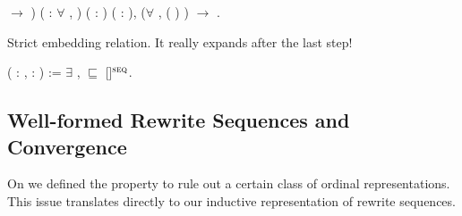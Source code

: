 \begin{singlespace}
\begin{coqdoccode}
\ensuremath{\rightarrow} )
( : \ensuremath{\forall} ,
 )\coqdoceol
\coqdocindent{5.00em}
( :
 
) (\coqdocvar{$\tau$} : 
),\coqdoceol
\coqdocindent{9.50em}
(\ensuremath{\forall} , ( )
 \coqdocvariable{$\tau$})
\ensuremath{\rightarrow}\coqdoceol
\coqdocindent{9.50em}
 
 
\coqdocvariable{$\tau$}.\coqdoceol
\end{coqdoccode}
\end{singlespace}

Strict embedding relation. It really expands after the last step!
\begin{singlespace}
\begin{coqdoccode}
\coqdocnoindent
{}
    (\coqdocvar{$\rho$} :
,
\coqdocvar{$\tau$} :
) := \ensuremath{\exists} ,
\coqdocvariable{$\rho$} $\sqsubseteq$
\coqdocvariable{$\tau$}[]$^\textsc{seq}$.\coqdoceol
\end{coqdoccode}
\end{singlespace}


\subsection{Well-formed Rewrite Sequences and Convergence}\label{sub:wf}

On  we defined the
 property to rule out a certain
class of ordinal representations. This issue translates directly to our
inductive representation of rewrite sequences.

